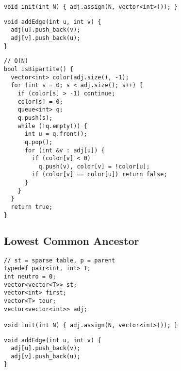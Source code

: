 \documentclass[twoside]{article}
\begin{document}
\begin{multicols*}{2}
\begin{verbatim}
void init(int N) { adj.assign(N, vector<int>()); }
\end{verbatim}
\vspace{-12pt}
\begin{verbatim}
void addEdge(int u, int v) {
  adj[u].push_back(v);
  adj[v].push_back(u);
}
\end{verbatim}
\vspace{-12pt}
\begin{verbatim}
// O(N)
bool isBipartite() {
  vector<int> color(adj.size(), -1);
  for (int s = 0; s < adj.size(); s++) {
    if (color[s] > -1) continue;
    color[s] = 0;
    queue<int> q;
    q.push(s);
    while (!q.empty()) {
      int u = q.front();
      q.pop();
      for (int &v : adj[u]) {
        if (color[v] < 0)
          q.push(v), color[v] = !color[u];
        if (color[v] == color[u]) return false;
      }
    }
  }
  return true;
}
\end{verbatim}

\subsectionfont{\large\bfseries\sffamily\underline}
\subsection*{Lowest Common Ancestor}
\begin{verbatim}
// st = sparse table, p = parent
typedef pair<int, int> T;
int neutro = 0;
vector<vector<T>> st;
vector<int> first;
vector<T> tour;
vector<vector<int>> adj;

void init(int N) { adj.assign(N, vector<int>()); }
\end{verbatim}
\vspace{-12pt}
\begin{verbatim}
void addEdge(int u, int v) {
  adj[u].push_back(v);
  adj[v].push_back(u);
}


\end{verbatim}
\end{multicols*}
\end{document}
